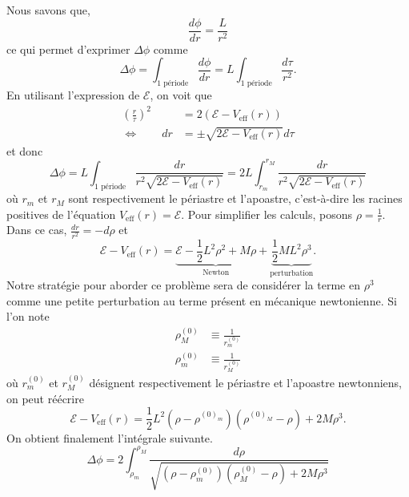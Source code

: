 \documentclass[a4paper,11pt]{report}
\begin{document}
        Nous savons que, 
        \begin{equation}
            \frac{d\phi}{dr} = \frac{L}{r^2}
        \end{equation}
        ce qui permet d'exprimer $\Delta\phi$ comme
        \begin{equation}
            \Delta\phi = \int_{\text{1 période}}\frac{d\phi}{dr} = L\int_{\text{1 période}}\frac{d\tau}{r^2}.
        \end{equation}
        En utilisant l'expression de $\mathscr{E}$, on voit que
        \begin{align}
            \left( \frac{r}{\tau} \right)^2 &= 2(\mathscr{E}-V_{\text{eff}}(r))\\
            \Leftrightarrow\qquad dr &= \pm\sqrt{2\mathscr{E}-V_{\text{eff}}(r)}d\tau
        \end{align}
        et donc
        \begin{equation}
            \Delta\phi = L\int_{\text{1 période}}\frac{dr}{r^2\sqrt{2\mathscr{E}-V_{\text{eff}}(r)}} = 2L\int_{r_m}^{r_M}\frac{dr}{r^2\sqrt{2\mathscr{E}-V_{\text{eff}}(r)}}
        \end{equation}
        où $r_m$ et $r_M$ sont respectivement le périastre et l'apoastre, c'est-à-dire les racines positives de l'équation $V_{\text{eff}}(r)=\mathscr{E}$. Pour simplifier les calculs, posons $\rho=\frac{1}{r}$. Dans ce cas, $\frac{dr}{r^2} = -d\rho$ et 
        \begin{equation}
            \mathscr{E}-V_{\text{eff}}(r) = \underbrace{\mathscr{E}-\frac{1}{2}L^2\rho^2+M\rho}_{\text{Newton}}+\underbrace{\frac{1}{2}ML^2\rho^3}_{\text{perturbation}}.
        \end{equation}
        Notre stratégie pour aborder ce problème sera de considérer la terme en $\rho^3$ comme une petite perturbation au terme présent en mécanique newtonienne. Si l'on note
        \begin{align}
            \rho^{(0)}_M &\equiv \frac{1}{r^{(0)}_m}\\
            \rho^{(0)}_m &\equiv \frac{1}{r^{(0)}_M}
        \end{align}
        où $r^{(0)}_m$ et $r^{(0)}_M$ désignent respectivement le périastre et l'apoastre newtonniens, on peut réécrire
        \begin{equation}
            \mathscr{E}-V_{\text{eff}}(r) = \frac{1}{2}L^2\left( \rho-\rho^{(0)_m} \right)\left( \rho^{(0)_M}-\rho \right)+2M\rho^3.
        \end{equation}
        On obtient finalement l'intégrale suivante.
        \begin{equation}
            \Delta\phi = 2\int^{\rho_M}_{\rho_m}\frac{d\rho}{\sqrt{\left( \rho-\rho^{(0)}_m \right)\left( \rho^{(0)}_M-\rho \right)+2M\rho^3}}
        \end{equation}
        
\end{document}
